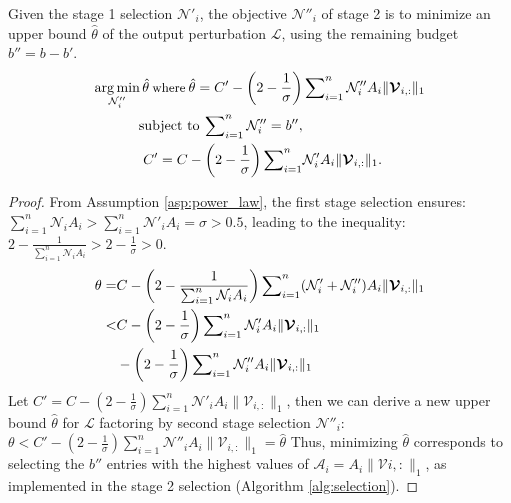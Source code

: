 \begin{theorem}
	\label{thm:target}
	Given the stage 1 selection $\mathcal{N}'_i$, the objective $\mathcal{N}''_i$ of stage 2  is to minimize an upper bound $\hat{\theta}$ of the output perturbation $\mathcal{L}$, using the remaining budget $b'' = b - b'$.
	\begin{align}
		\small
	\operatorname*{arg\,min}_{\mathcal{N}''_i}\hat{\theta} \:  \text{where} \: \hat{\theta} =   C' - \left(2 - \frac{1}{\sigma}\right)&\sum\nolimits_{i=1}^{n}  \mathcal{N}''_i A_i \lVert \boldsymbol{\mathcal{V}}_{i,:}  \rVert_1 \notag \\ \text{subject to}  \: \sum\nolimits_{i=1}^{n} \mathcal{N}''_i = b'', \notag \\
	 C' =   C -  \left(2 - \frac{1}{\sigma}\right) \sum\nolimits_{i=1}^{n} & \mathcal{N}'_i A_i \lVert \boldsymbol{\mathcal{V}}_{i,:} \rVert_1.
	\end{align}	
\begin{proof}

	From Assumption \ref{asp:power_law}, the first stage selection ensures:  $\sum\nolimits_{i=1}^{n}  \mathcal{N}_i A_i >\sum\nolimits_{i=1}^{n}  \mathcal{N}'_i A_i = \sigma > 0.5$, leading to the inequality: $2- \frac{1}{\sum\nolimits_{i=1}^{n} \mathcal{N}_i A_{i}} > 2 - \frac{1}{\sigma} >0$.
	{
		\small
			\begin{align}
			\theta =&   C - \left(2- \frac{1}{\sum\nolimits_{i=1}^{n} \mathcal{N}_i A_{i}} \right) \sum\nolimits_{i=1}^{n}  (\mathcal{N}'_i+\mathcal{N}''_i) A_i \lVert \boldsymbol{\mathcal{V}}_{i,:} \rVert_1  \notag \\
			< & C -  \left(2 - \frac{1}{\sigma}\right)\sum\nolimits_{i=1}^{n}  \mathcal{N}'_i A_i \lVert \boldsymbol{\mathcal{V}}_{i,:} \rVert_1 \notag \\
			 & -\left(2 - \frac{1}{\sigma}\right) \sum\nolimits_{i=1}^{n}  \mathcal{N}''_i A_i \lVert \boldsymbol{\mathcal{V}}_{i,:} \rVert_1
		\end{align}
	}
	Let $C' =  C -  \left(2 - \frac{1}{\sigma}\right) \sum\nolimits_{i=1}^{n}  \mathcal{N}'_i A_i \lVert \boldsymbol{\mathcal{V}}_{i,:} \rVert_1$, then we can derive a new upper bound $\hat{\theta}$ for $\mathcal{L}$ factoring by second stage selection $\mathcal{N}''_i$: $ \theta <  C' - \left(2 - \frac{1}{\sigma}\right)\sum\nolimits_{i=1}^{n}  \mathcal{N}''_i A_i \lVert \boldsymbol{\mathcal{V}}_{i,:} \rVert_1 = \hat{\theta} $
	Thus, minimizing $\hat{\theta}$ corresponds to selecting the $b''$ entries with the highest values of $\boldsymbol{\mathcal{A}}_i = A_i \lVert \boldsymbol{\mathcal{V}}{i,:} \rVert_1$, as implemented in the stage 2 selection  (Algorithm \ref{alg:selection}).
\end{proof}
\end{theorem}

